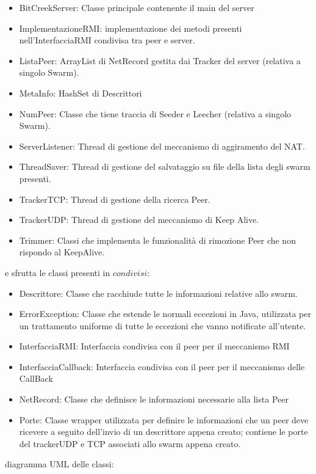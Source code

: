 \begin{itemize}
\item BitCreekServer: Classe principale contenente il main del server
\item ImplementazioneRMI: implementazione dei metodi presenti nell'InterfacciaRMI condivisa tra peer e server.
\item ListaPeer: ArrayList di NetRecord gestita dai Tracker del server (relativa a singolo Swarm).
\item MetaInfo: HashSet di Descrittori
\item NumPeer: Classe che tiene traccia di Seeder e Leecher (relativa a singolo Swarm).
\item ServerListener: Thread di gestione del meccanismo di aggiramento del NAT.
\item ThreadSaver: Thread di gestione del salvataggio su file della lista degli swarm presenti.
\item TrackerTCP: Thread di gestione della ricerca Peer.
\item TrackerUDP: Thread di gestione del meccanismo di Keep Alive.
\item Trimmer: Classi che implementa le funzionalit\`a di rimozione Peer che non rispondo al KeepAlive.
\end{itemize}

e sfrutta le classi presenti in $condivisi$:

\begin{itemize}
\item Descrittore: Classe che racchiude tutte le informazioni relative allo swarm.
\item ErrorException: Classe che estende le normali eccezioni in Java, utilizzata per un trattamento uniforme di tutte le eccezioni che vanno notificate all'utente.
\item InterfacciaRMI: Interfaccia condivisa con il peer per il meccanismo RMI
\item InterfacciaCallback: Interfaccia condivisa con il peer per il meccanismo delle CallBack
\item NetRecord: Classe che definisce le informazioni necessarie alla lista Peer
\item Porte: Classe wrapper utilizzata per definire le informazioni che un peer deve ricevere a seguito dell'invio di un descrittore appena creato; contiene le porte del trackerUDP e TCP associati allo swarm appena creato.
\end{itemize}

diagramma UML delle classi:

